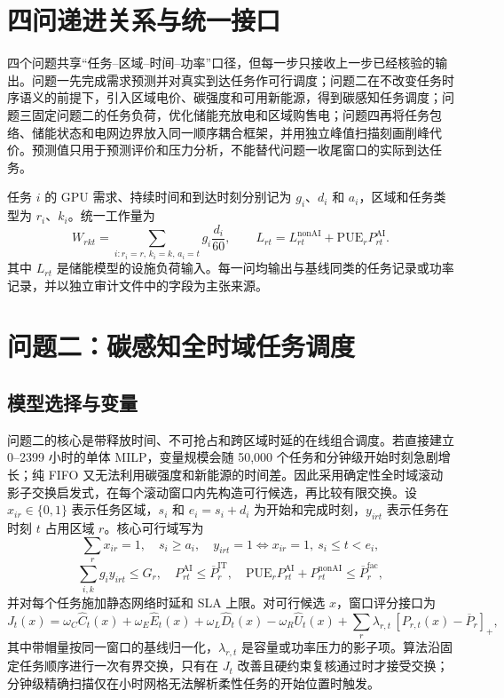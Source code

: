 \section{四问递进关系与统一接口}

四个问题共享“任务--区域--时间--功率”口径，但每一步只接收上一步已经核验的输出。问题一先完成需求预测并对真实到达任务作可行调度；问题二在不改变任务时序语义的前提下，引入区域电价、碳强度和可用新能源，得到碳感知任务调度；问题三固定问题二的任务负荷，优化储能充放电和区域购售电；问题四再将任务包络、储能状态和电网边界放入同一顺序耦合框架，并用独立峰值扫描刻画削峰代价。预测值只用于预测评价和压力分析，不能替代问题一收尾窗口的实际到达任务。

任务 $i$ 的 GPU 需求、持续时间和到达时刻分别记为 $g_i$、$d_i$ 和 $a_i$，区域和任务类型为 $r_i$、$k_i$。统一工作量为
\begin{equation}
  W_{rkt}=\sum_{i:r_i=r,\,k_i=k,\,a_i=t}g_i\frac{d_i}{60},
  \qquad
  L_{rt}=L^{\mathrm{nonAI}}_{rt}+\mathrm{PUE}_{r}P^{\mathrm{AI}}_{rt}.
\end{equation}
其中 $L_{rt}$ 是储能模型的设施负荷输入。每一问均输出与基线同类的任务记录或功率记录，并以独立审计文件中的字段为主张来源。

\section{问题二：碳感知全时域任务调度}
\label{sec:q2-proposal}

\subsection{模型选择与变量}

问题二的核心是带释放时间、不可抢占和跨区域时延的在线组合调度。若直接建立 0--2399 小时的单体 MILP，变量规模会随 50,000 个任务和分钟级开始时刻急剧增长；纯 FIFO 又无法利用碳强度和新能源的时间差。因此采用确定性全时域滚动影子交换启发式，在每个滚动窗口内先构造可行候选，再比较有限交换。设 $x_{ir}\in\{0,1\}$ 表示任务区域，$s_i$ 和 $e_i=s_i+d_i$ 为开始和完成时刻，$y_{irt}$ 表示任务在时刻 $t$ 占用区域 $r$。核心可行域写为
\begin{equation}
  \sum_r x_{ir}=1,\quad s_i\ge a_i,\quad
  y_{irt}=1\Longleftrightarrow x_{ir}=1,\ s_i\le t<e_i,
\end{equation}
\begin{equation}
  \sum_{i,k}g_i y_{irt}\le G_r,\quad
  P^{\mathrm{AI}}_{rt}\le \overline P^{\mathrm{IT}}_r,
  \quad \mathrm{PUE}_rP^{\mathrm{AI}}_{rt}+P^{\mathrm{nonAI}}_{rt}\le \overline P^{\mathrm{fac}}_r,
\end{equation}
并对每个任务施加静态网络时延和 SLA 上限。对可行候选 $x$，窗口评分接口为
\begin{equation}
  J_t(x)=\omega_C\widehat C_t(x)+\omega_E\widehat E_t(x)
  +\omega_L\widehat D_t(x)-\omega_R\widehat U_t(x)
  +\sum_r\lambda_{r,t}\,[P_{r,t}(x)-\overline P_r]_+,
\end{equation}
其中带帽量按同一窗口的基线归一化，$\lambda_{r,t}$ 是容量或功率压力的影子项。算法沿固定任务顺序进行一次有界交换，只有在 $J_t$ 改善且硬约束复核通过时才接受交换；分钟级精确扫描仅在小时网格无法解析柔性任务的开始位置时触发。

